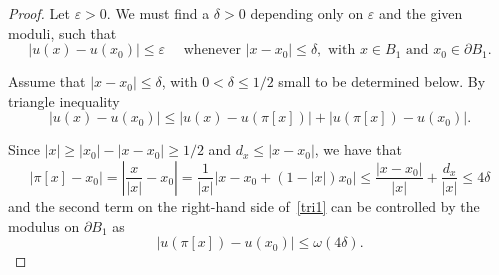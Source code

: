 \documentclass[10pt,a4paper]{amsart}
\newcommand{\vep}{\varepsilon}
\begin{document}
\begin{proof}
Let $\vep > 0$.
We must find a $\delta > 0$ depending only on $\vep$ and the given moduli, such that
\begin{equation}
\label{tri0}
|u(x) - u(x_0)| \leq \vep \quad \text{ whenever } |x - x_0| \leq \delta, \text{ with } x \in B_1 \text{ and } x_0 \in \partial B_1.
\end{equation}

\medskip

Assume that $|x - x_0| \leq \delta$, with $0 < \delta \leq 1/2$ small to be determined below.
By triangle inequality
\begin{equation}
\label{tri1}
|u(x) - u(x_0)| \leq |u(x) - u(\pi[x])| + |u(\pi[x]) - u(x_0)|.
\end{equation}

Since $|x| \geq |x_0| - |x- x_0| \geq 1/2$ and $d_x \leq |x- x_0|$, we have  that
\[
|\pi[x] - x_0 | = 
\left|\frac{x}{|x|} - x_0\right| 
= \frac{1}{|x|}\big|x - x_0 + (1-|x|) x_0\big|
\leq \frac{|x- x_0|}{|x|} +\frac{d_x}{|x|}
\leq 4 \delta
\]
and the second term on the right-hand side of~\eqref{tri1} can be controlled by the modulus on $\partial B_1$ as
\begin{equation}
\label{tri2}
|u(\pi[x]) - u(x_0)| \leq \omega(4 \delta).
\end{equation}

\medskip


\end{proof}
\end{document}
